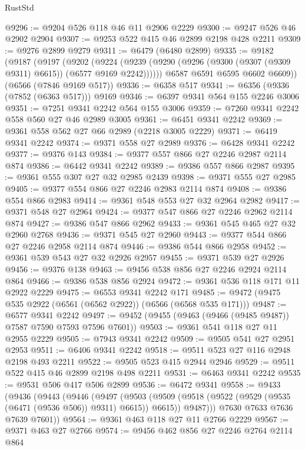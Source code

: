 \begin{lexlean}{RustStd}
\begin{coremodule}
@9296 := @9204 @526 @118 @46 @11 @2906 @2229
@9300 := @9247 @526 @46 @2902 @2904
@9307 := @9253 @522 @415 @46 @2899 @2198 @428 @2211
@9309 := @9276 @2899 @9279
@9311 := @6479 (@6480 @2899)
@9335 := @9182
    (@9187
      (@9197
        (@9202
          (@9224 (@9239 (@9290 (@9296 (@9300 (@9307 (@9309 @9311) @6615)) (@6577 @9169 @2242))))))
        @6587
        @6591
        @6595
        @6602
        @6609))
    (@6566 (@7846 @9169 @517))
@9336 := @6358 @517
@9341 := @6356 (@9336 (@7852 (@6363 @517))) @9169
@9346 := @6397 @9341 @564 @155 @2246 @3006
@9351 := @7251 @9341 @2242 @564 @155 @3006
@9359 := @7260 @9341 @2242 @558 @560 @27 @46 @2989 @3005
@9361 := @6451 @9341 @2242
@9369 := @9361 @558 @562 @27 @66 @2989 (@2218 @3005 @2229)
@9371 := @6419 @9341 @2242
@9374 := @9371 @558 @27 @2989
@9376 := @6428 @9341 @2242
@9377 := @9376 @143
@9384 := @9377 @557 @866 @27 @2246 @2987 @2114 @874
@9386 := @6442 @9341 @2242
@9389 := @9386 @557 @866 @2987
@9395 := @9361 @555 @307 @27 @32 @2985 @2439
@9398 := @9371 @555 @27 @2985
@9405 := @9377 @554 @866 @27 @2246 @2983 @2114 @874
@9408 := @9386 @554 @866 @2983
@9414 := @9361 @548 @553 @27 @32 @2964 @2982
@9417 := @9371 @548 @27 @2964
@9424 := @9377 @547 @866 @27 @2246 @2962 @2114 @874
@9427 := @9386 @547 @866 @2962
@9433 := @9361 @545 @465 @27 @32 @2960 @2768
@9436 := @9371 @545 @27 @2960
@9443 := @9377 @544 @866 @27 @2246 @2958 @2114 @874
@9446 := @9386 @544 @866 @2958
@9452 := @9361 @539 @543 @27 @32 @2926 @2957
@9455 := @9371 @539 @27 @2926
@9456 := @9376 @138
@9463 := @9456 @538 @856 @27 @2246 @2924 @2114 @864
@9466 := @9386 @538 @856 @2924
@9472 := @9361 @536 @118 @171 @11 @2922 @2229
@9475 := @6553 @9341 @2242 @171
@9485 := @9472 (@9475 @535 @2922 (@6561 (@6562 @2922)) (@6566 (@6568 @535 @171)))
@9487 := @6577 @9341 @2242
@9497 := @9452 (@9455 (@9463 (@9466 (@9485 @9487)) @7587 @7590 @7593 @7596 @7601))
@9503 := @9361 @541 @118 @27 @11 @2955 @2229
@9505 := @7943 @9341 @2242
@9509 := @9505 @541 @27 @2951 @2953
@9511 := @6406 @9341 @2242
@9518 := @9511 @523 @27 @116 @2948 @2198 @493 @2211
@9522 := @9505 @523 @415 @2944 @2946
@9529 := @9511 @522 @415 @46 @2899 @2198 @498 @2211
@9531 := @6463 @9341 @2242
@9535 := @9531 @506 @417 @506 @2899
@9536 := @6472 @9341
@9558 := @9433
    (@9436
      (@9443
        (@9446
          (@9497
            (@9503
              (@9509 (@9518 (@9522 (@9529 (@9535 (@6471 (@9536 @506)) @9311) @6615)) @6615))
              @9487)))
        @7630
        @7633
        @7636
        @7639
        @7601))
@9564 := @9361 @463 @118 @27 @11 @2766 @2229
@9567 := @9371 @463 @27 @2766
@9574 := @9456 @462 @856 @27 @2246 @2764 @2114 @864

\end{coremodule}
\end{lexlean}
